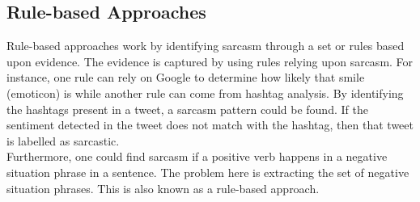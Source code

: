 \subsection{Rule-based Approaches~\cite{joshi2017automatic}}
Rule-based approaches work by identifying sarcasm through a set or rules based upon evidence. The evidence is captured by using rules relying upon sarcasm. For instance, one rule can rely on Google to determine how likely that smile (emoticon) is while another rule can come from hashtag analysis. By identifying the hashtags present in a tweet, a sarcasm pattern could be found. If the sentiment detected in the tweet does not match with the hashtag, then that tweet is labelled as sarcastic.\\ Furthermore, one could find sarcasm if a positive verb happens in a negative situation phrase in a sentence. The problem here is extracting the set of negative situation phrases. This is also known as a rule-based approach.
